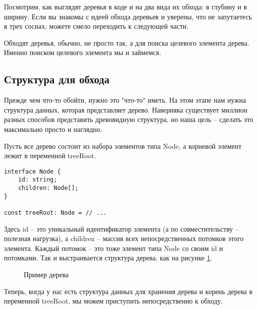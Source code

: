 \documentclass[../../article]{subfiles}
\begin{document}
{Посмотрим, как выглядят деревья в коде и на два вида их обхода: в глубину и в ширину. Если вы знакомы с идеей обхода деревьев и уверены, что не запутаетесь в трех соснах, можете смело переходить к следующей части.}

Обходят деревья, обычно, не просто так, а для поиска целевого элемента дерева. Именно поиском целевого элемента мы и займемся.

\subsection{Структура для обхода}

Прежде чем что-то обойти, нужно это "что-то" иметь. На этом этапе нам нужна структура данных, которая представляет дерево. Наверняка существует миллион разных способов представить древовидную структура, но наша цель – сделать это максимально просто и наглядно.

Пусть все дерево состоит из набора элементов типа {\firacodebold Node}, а корневой элемент лежит в переменной {\firacodebold treeRoot}.
    \begin{ruledelement}
        \begin{lstlisting}[label={lst:treeStructure}]
interface Node {
    id: string;
    children: Node[];
}

const treeRoot: Node = // ...
        \end{lstlisting}
    \end{ruledelement}

Здесь {\firacodebold id} – это уникальный идентификатор элемента (а по совместительству – полезная нагрузка), а {\firacodebold children} – массив всех непосредственных потомков этого элемента. Каждый потомок – это тоже элемент типа {\firacodebold Node} со своим {\firacodebold id} и потомками. Так и выстраивается структура дерева, как на рисунке \ref{fig:exampleTree}.

\begin{figure}
    \caption{Пример дерева}
    \label{fig:exampleTree}
\end{figure}

Теперь, когда у нас есть структура данных для хранения дерева и корень дерева в переменной {\firacodebold treeRoot}, мы можем приступить непосредственно к обходу.
\end{document}
